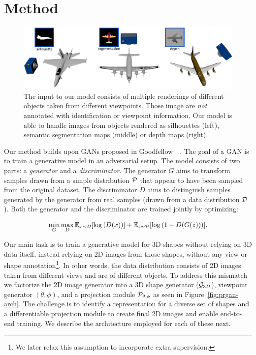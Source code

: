 \section{Method}\label{s:method}
\begin{figure}
  \centering
  \includegraphics[width=0.85\linewidth]{fig/projections.pdf}
  \caption{\label{fig:projection} 
    The input to our model consists of multiple renderings of
    different objects taken from different viewpoints.
    Those image are \emph{not} annotated with identification or viewpoint information.
    Our model is able to handle images from objects rendered as
    silhouettes (left), semantic segmentation maps (middle) or
    depth maps (right).
}
\vspace{-8pt}
\end{figure}


Our method builds upon GANs proposed in
Goodfellow~\etal~\cite{goodfellow2014generative}.
The goal of a GAN is to train a generative model in an
adversarial setup.
The model consists of two parts: a \emph{generator} and a
\emph{discriminator}.
The generator $G$ aims to transform samples drawn from a simple
distribution ${\cal P}$ that appear to have been sampled from the
original dataset.
The discriminator $D$ aims to distinguish samples generated
by the generator from real samples (drawn from a data distribution
${\cal D}$).
Both the generator and the discriminator are trained jointly by
optimizing:

\begin{equation}\label{eqn:gan}
\min_{G}\max_{D} \mathbb{E}_{x\sim{\cal D}} [ \log \left(D(x)\right) ] + \mathbb{E}_{z\sim{\cal P}} [ \log \left(1-D(G(z))\right)].
\end{equation}

Our main task is to train a generative model for 3D shapes without
relying on 3D data itself, instead relying on 2D images from those shapes, without
any view or shape annotation\footnote{We later relax this assumption
  to incorporate extra supervision.}.
In other words, the data distribution consists of 2D images taken from
different views and are of different objects.
To address this mismatch we factorize the 2D image generator into a 3D
shape generator (${\cal G}_{3D}$), viewpoint generator $(\theta,\phi)$, and a
projection module ${\cal P_{\theta,\phi}}$ as seen in Figure~\ref{fig:prgan-arch}.
The challenge is to identify a representation for a diverse set of shapes
and a differentiable projection module to create final 2D images and
enable end-to-end training. 
We describe the architecture employed for each of these next. 

